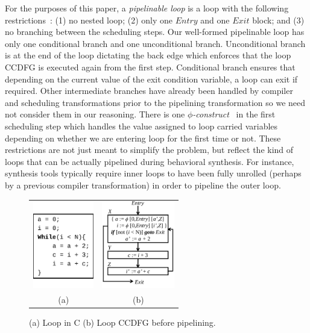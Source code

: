 For the purposes of this paper, a {\em pipelinable loop} is a loop with the following restrictions~\cite{hrx:dac-12}: (1) no nested loop; 
(2) only one $Entry$ and one $Exit$ block; and (3) no branching between the scheduling steps.  
Our well-formed pipelinable loop has only one conditional branch and one unconditional branch. 
Unconditional branch is at the end of the loop dictating the back edge which enforces that the loop CCDFG is executed again from the first step. 
Conditional branch ensures that depending on the current value of the exit condition variable, a loop can exit if required. 
Other intermediate branches have already been handled by compiler and scheduling transformations prior to the pipelining transformation
so we need not consider them in our reasoning. There is one {\em $\phi$-construct}~\cite{llvmphi} in the first scheduling step which handles the value assigned
to loop carried variables depending on whether we are entering loop for the first time or not. These restrictions are not just meant to simplify the problem, but reflect the kind of loops that can be actually pipelined during behavioral
synthesis. For instance, synthesis tools typically require inner loops to have been fully unrolled (perhaps by a previous compiler
transformation) in order to pipeline the outer loop.

\begin{figure}[H]%
\begin{center}
\begin{tabular}{cc}
\includegraphics[height=1.5in]{fig-rpe/C-code}
& \hspace{2cm}
\includegraphics[height=1.5in]{fig-rpe/seq-ccdfg}
\\
(a) & \hspace{2cm} (b) 
\end{tabular}
\end{center}
\caption{(a) Loop in C (b) Loop CCDFG before pipelining.}
\label{fig:high-level-synthesis-1}
\end{figure}

